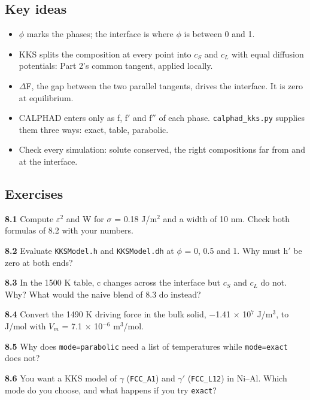 \documentclass[12pt,a4paper]{article}
\begin{document}
\subsection*{Key ideas}
\begin{itemize}
\item \(\phi\) marks the phases; the interface is where \(\phi\) is between 0 and 1.
\item KKS splits the composition at every point into \(c_{S}\) and \(c_{L}\) with equal diffusion potentials: Part 2's common tangent, applied locally.
\item \(\Delta\)F, the gap between the two parallel tangents, drives the interface. It is zero at equilibrium.
\item CALPHAD enters only as f, f\('\) and f\(''\) of each phase. \texttt{calphad\_\allowbreak{}kks.\allowbreak{}py} supplies them three ways: exact, table, parabolic.
\item Check every simulation: solute conserved, the right compositions far from and at the interface.
\end{itemize}

\subsection*{Exercises}
\textbf{8.1} Compute \(\varepsilon ^{2}\) and W for \(\sigma\) = 0.18 J/m\(^{2}\) and a width of 10 nm. Check both formulas of 8.2 with your numbers.

\textbf{8.2} Evaluate \texttt{KKSModel.\allowbreak{}h} and \texttt{KKSModel.\allowbreak{}dh} at \(\phi\) = 0, 0.5 and 1. Why must h\('\) be zero at both ends?

\textbf{8.3} In the 1500 K table, c changes across the interface but \(c_{S}\) and \(c_{L}\) do not. Why? What would the naive blend of 8.3 do instead?

\textbf{8.4} Convert the 1490 K driving force in the bulk solid, \(-\)1.41 \(\times\) 10\(^{7}\) J/m\(^{3}\), to J/mol with \(V_{m}\) = 7.1 \(\times\) 10\(^{-6}\) m\(^{3}\)/mol.

\textbf{8.5} Why does \texttt{mode=\textquotedbl{}parabolic\textquotedbl{}} need a list of temperatures while \texttt{mode=\textquotedbl{}exact\textquotedbl{}} does not?

\textbf{8.6} You want a KKS model of \(\gamma\) (\texttt{FCC\_\allowbreak{}A1}) and \(\gamma '\) (\texttt{FCC\_\allowbreak{}L12}) in Ni--Al. Which mode do you choose, and what happens if you try \texttt{\textquotedbl{}exact\textquotedbl{}}?
\end{document}
